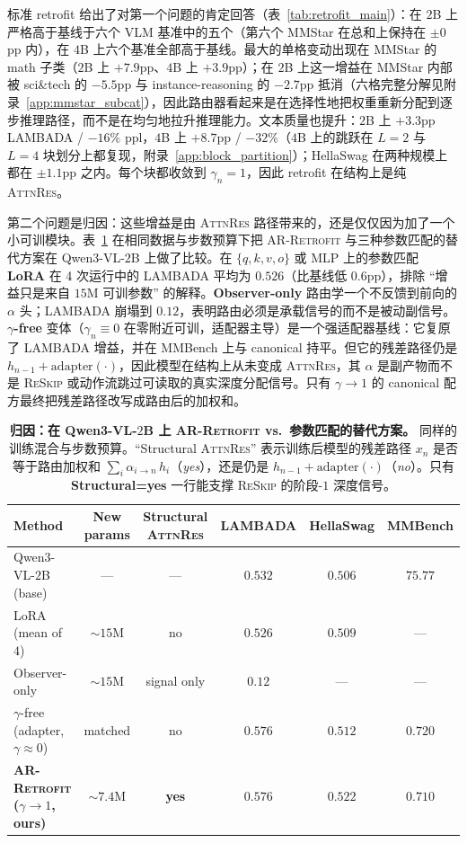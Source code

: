 \documentclass{article}
\newcommand{\attnres}{\textsc{AttnRes}}
\newcommand{\reskip}{\textsc{ReSkip}}
\newcommand{\retrofit}{\textsc{AR-Retrofit}}
\begin{document}
标准 retrofit 给出了对第一个问题的肯定回答（表~\ref{tab:retrofit_main}）：在 $2$B 上严格高于基线于六个 VLM 基准中的五个（第六个 MMStar 在总和上保持在 $\pm 0$pp 内），在 $4$B 上六个基准全部高于基线。最大的单格变动出现在 MMStar 的 math 子类（$2$B 上 $+7.9$pp、$4$B 上 $+3.9$pp）；在 $2$B 上这一增益在 MMStar 内部被 sci\&tech 的 $-5.5$pp 与 instance-reasoning 的 $-2.7$pp 抵消（六格完整分解见附录~\ref{app:mmstar_subcat}），因此路由器看起来是在选择性地把权重重新分配到逐步推理路径，而不是在均匀地拉升推理能力。文本质量也提升：$2$B 上 $+3.3$pp LAMBADA / $-16\%$ ppl，$4$B 上 $+8.7$pp / $-32\%$（$4$B 上的跳跃在 $L{=}2$ 与 $L{=}4$ 块划分上都复现，附录~\ref{app:block_partition}）；HellaSwag 在两种规模上都在 $\pm 1.1$pp 之内。每个块都收敛到 $\gamma_n{=}1$，因此 retrofit 在结构上是纯 \attnres{}。

第二个问题是归因：这些增益是由 \attnres{} 路径带来的，还是仅仅因为加了一个小可训模块。表~\ref{tab:attribution} 在相同数据与步数预算下把 \retrofit{} 与三种参数匹配的替代方案在 Qwen3-VL-$2$B 上做了比较。在 $\{q,k,v,o\}$ 或 MLP 上的参数匹配 \textbf{LoRA} 在 4 次运行中的 LAMBADA 平均为 $0.526$（比基线低 $0.6$pp），排除 ``增益只是来自 $15$M 可训参数'' 的解释。\textbf{Observer-only} 路由学一个不反馈到前向的 $\alpha$ 头；LAMBADA 崩塌到 $0.12$，表明路由必须是承载信号的而不是被动副信号。\textbf{$\gamma$-free} 变体（$\gamma_n{\equiv}0$ 在零附近可训，适配器主导）是一个强适配器基线：它复原了 LAMBADA 增益，并在 MMBench 上与 canonical 持平。但它的残差路径仍是 $h_{n-1} + \mathrm{adapter}(\cdot)$，因此模型在结构上从未变成 \attnres{}，其 $\alpha$ 是副产物而不是 \reskip{} 或动作流跳过可读取的真实深度分配信号。只有 $\gamma{\to}1$ 的 canonical 配方最终把残差路径改写成路由后的加权和。

\begin{table}[t]
\caption{\textbf{归因：在 Qwen3-VL-$2$B 上 \retrofit{} vs.\ 参数匹配的替代方案。} 同样的训练混合与步数预算。``Structural \attnres{}'' 表示训练后模型的残差路径 $x_n$ 是否等于路由加权和 $\sum_i \alpha_{i\to n}\,h_i$（\emph{yes}），还是仍是 $h_{n-1}+\mathrm{adapter}(\cdot)$（\emph{no}）。只有 \textbf{Structural=yes} 一行能支撑 \reskip{} 的阶段-$1$ 深度信号。}
\label{tab:attribution}
\centering\small
\begin{tabular}{lccccc}
\toprule
Method & New params & Structural \attnres{} & LAMBADA & HellaSwag & MMBench \\
\midrule
Qwen3-VL-$2$B (base)                       & ---         & ---     & $0.532$ & $0.506$ & $75.77$ \\
LoRA (mean of $4$)                         & $\sim$$15$M & no      & $0.526$ & $0.509$ & --- \\
Observer-only                              & $\sim$$15$M & signal only & $0.12$  & ---     & --- \\
$\gamma$-free (adapter, $\gamma{\approx}0$)& matched & no      & $0.576$ & $0.512$ & $0.720$ \\
\textbf{\retrofit{} ($\gamma{\to}1$, ours)}& $\sim$$7.4$M & \textbf{yes} & $\mathbf{0.576}$ & $\mathbf{0.522}$ & $\mathbf{0.710}$ \\
\bottomrule
\end{tabular}
\end{table}
\end{document}
